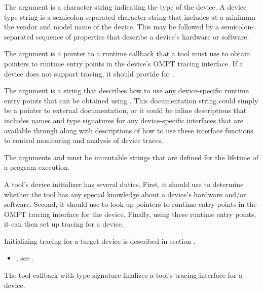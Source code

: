 The argument  is a character string indicating the
type of the device. A device type string is a semicolon separated
character string that includes at a minimum the vendor and model name
of the device. This may be followed by a semicolon-separated sequence
of properties that describe a device's hardware or software.

\devicedesc

The argument  is a pointer to a runtime callback
that a tool must use to obtain pointers to runtime entry points in the
device's OMPT tracing interface. If a device does not support tracing,
it should provide  for .

The argument  is a string that describes
how to use any device-specific runtime
entry points that can be obtained using . This
documentation string could simply be a pointer to external
documentation, or it could be inline descriptions
that includes names and type signatures for any
device-specific interfaces that are available through 
along with descriptions of how to use these interface functions to
control monitoring and analysis of device traces.

\constraints
The arguments  and  must be
immutable strings that are defined for the lifetime of a program
execution.

\effect

A tool's device initializer has several duties.  First, it should use
 to determine whether the tool has any special knowledge
about a device's hardware and/or software.  Second, it should use
 to look up pointers to runtime entry points in the OMPT tracing
interface for the device.  Finally, using these runtime entry points, it can
then set up tracing for a device.

Initializing tracing for a target device is described in section
.

\crossreferences
\begin{itemize}
\item {}, see
  .
\end{itemize}


\label{sec:ompt_callback_device_finalize_t}

\summary The tool callback with type signature
 finalizes a
tool's tracing interface for a device.

